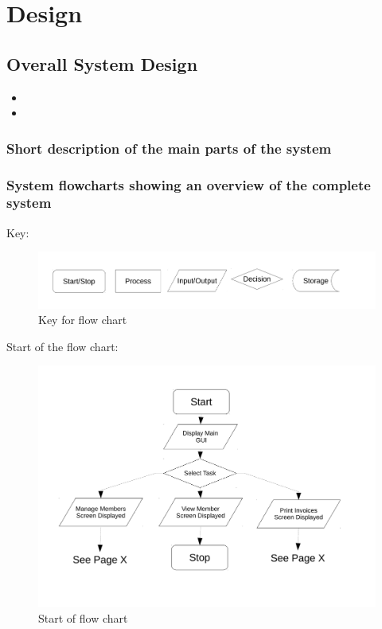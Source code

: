 \chapter{Design}

\section{Overall System Design}

\begin{itemize}
	\item
	\item
\end{itemize}

\subsection{Short description of the main parts of the system}

\subsection{System flowcharts showing an overview of the complete system}

Key:
\begin{figure}[H]
\includegraphics[width=\textwidth]{./Design/images/FC_key.pdf}
    \caption{Key for flow chart} \label{fig:Flow Chart Key}
\end{figure}

Start of the flow chart:
\begin{figure}[H]
\includegraphics[width=\textwidth]{./Design/images/FC_start.pdf}
    \caption{Start of flow chart} \label{fig:Flow Chart Start}
\end{figure}

